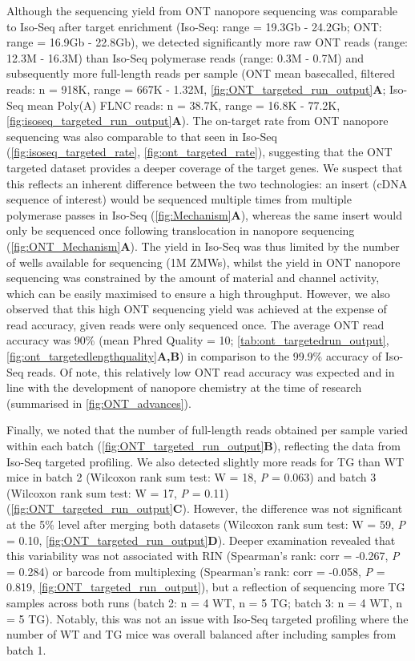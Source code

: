 \newpage
Although the sequencing yield from ONT nanopore sequencing was comparable to Iso-Seq after target enrichment (Iso-Seq: range = 19.3Gb - 24.2Gb; ONT: range = 16.9Gb - 22.8Gb), we detected significantly more raw ONT reads (range: 12.3M - 16.3M) than Iso-Seq polymerase reads (range: 0.3M - 0.7M) and subsequently more full-length reads per sample (ONT mean basecalled, filtered reads: n = 918K, range = 667K - 1.32M, \cref{fig:ONT_targeted_run_output}\textbf{A}; Iso-Seq mean Poly(A) FLNC reads: n = 38.7K, range = 16.8K - 77.2K, \cref{fig:isoseq_targeted_run_output}\textbf{A}). The on-target rate from ONT nanopore sequencing was also comparable to that seen in Iso-Seq (\cref{fig:isoseq_targeted_rate}, \cref{fig:ont_targeted_rate}), suggesting that the ONT targeted dataset provides a deeper coverage of the target genes. We suspect that this reflects an inherent difference between the two technologies: an insert (cDNA sequence of interest) would be sequenced multiple times from multiple polymerase passes in Iso-Seq (\cref{fig:Mechanism}\textbf{A}), whereas the same insert would only be sequenced once following translocation in nanopore sequencing (\cref{fig:ONT_Mechanism}\textbf{A}). The yield in Iso-Seq was thus limited by the number of wells available for sequencing (1M ZMWs), whilst the yield in ONT nanopore sequencing was constrained by the amount of material and channel activity, which can be easily maximised to ensure a high throughput. However, we also observed that this high ONT sequencing yield was achieved at the expense of read accuracy, given reads were only sequenced once. The average ONT read accuracy was 90\% (mean Phred Quality = 10; \cref{tab:ont_targetedrun_output}, \cref{fig:ont_targetedlengthquality}\textbf{A,B}) in comparison to the 99.9\% accuracy of Iso-Seq reads. Of note, this relatively low ONT read accuracy was expected and in line with the development of nanopore chemistry at the time of research (summarised in \cref{fig:ONT_advances}).  

Finally, we noted that the number of full-length reads obtained per sample varied within each batch (\cref{fig:ONT_targeted_run_output}\textbf{B}), reflecting the data from Iso-Seq targeted profiling. We also detected slightly more reads for TG than WT mice in batch 2 (Wilcoxon rank sum test: W = 18, \textit{P} = 0.063) and batch 3 (Wilcoxon rank sum test: W = 17, \textit{P} = 0.11) (\cref{fig:ONT_targeted_run_output}\textbf{C}). However, the difference was not significant at the 5\% level after merging both datasets (Wilcoxon rank sum test: W = 59, \textit{P} = 0.10, \cref{fig:ONT_targeted_run_output}\textbf{D}). Deeper examination revealed that this variability was not associated with RIN (Spearman's rank: corr = -0.267, \textit{P} = 0.284) or barcode from multiplexing (Spearman's rank: corr = -0.058, \textit{P} = 0.819, \cref{fig:ONT_targeted_run_output}), but a reflection of sequencing more TG samples across both runs (batch 2: n = 4 WT, n = 5 TG; batch 3: n = 4 WT, n = 5 TG). Notably, this was not an issue with Iso-Seq targeted profiling where the number of WT and TG mice was overall balanced after including samples from batch 1. %

